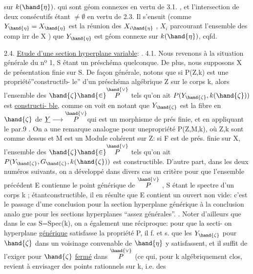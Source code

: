 
sur $k(\hand{\eta})$.
qui sont géom connexes en vertu de 3.1. , et  l'intersection
de deux consécutifs étant $\neq \emptyset$ en vertu de 2.3. Il s'ensuit (comme
$Y_{\hand{\eta}} = X_{\hand{\eta}}$ est la réunion des $X_{i\hand{\eta}}$ , $X_i$ parcourant l'ensemble des comp
irr de X ) que  $Y_{\hand{\eta}}$ est géom connexe sur $k(\hand{\eta})$, cqfd.

2.4. \uline{Etude d'une section hyperplane variable}:  .
4.1.
Nous revenons à la situation générale du nº 1, S étant un préschéma
quelconque. De plus, nous supposons X de présentation finie sur S.
De façon générale, notons que si P(Z,k) est une propriété''constructib-%
le''  d'un préschéma algébrique Z sur le corps k,
alors l'ensemble des $\hand{\zeta} \hand{\in} \overset{\hand{\vee}}{P}$ tels qu'on ait $P(Y_{\hand{\zeta}},k(\hand{\zeta}))$ est \uline{constructi-%
ble}, comme on voit en notant que $Y_{\hand{\zeta}}$ est la fibre en $\hand{\zeta}$ de $\underline{Y} \longrightarrow \overset{\hand{\vee}}{P}$\hand{,}qui
est un morphisme de prés finie, et en appliquant le par.9 . On a une
remarque analogue pour une\hand{|}propriété P(Z,M,k), où Z,k sont comme dessus
et M est un Module cohérent sur Z: si F est de prés. finie sur X, l'ensemble
des $\hand{\zeta} \hand{\in} \overset{\hand{\vee}}{P}$ tels qu'on ait $P(Y_{\hand{\zeta}},G_{\hand{\zeta}},k(\hand{\zeta}))$ est constructible. D'autre
part, dans les deux numéros suivants, on a développé  dans divers
cas un critère pour que l'ensemble précédent E contienne le point
générique de $\overset{\hand{\vee}}{P}$ , S étant le spectre d'un corps k ; étantconstructible,
il en résulte que E contient un ouvert non vide: c'est le passage d'une
conclusion pour la section hyperplane générique à la conclusion analo
gue pour les sections hyperplanes ``assez générales''.  \hand{[}\hand{]}. Noter d'ailleurs que \placedmargin{$\downarrow$}
dans le cas S=Spec(k), on a également une réciproque: pour que la secti-%
on hyperplane \uline{générique} satisfasse la propriété P, il f. et s. que
les $Y_{\hand{\zeta}}$ pour $\hand{\zeta}$ dans un voisinage convenable de $\hand{\eta}$ y satisfassent, et il
suffit de l'exiger pour $\hand{\zeta}$ \uline{fermé} dans $\overset{\hand{\vee}}{P}$ (ce qui, pour k algébriquement
clos, revient à envisager des points rationnels sur k, i.e. des

